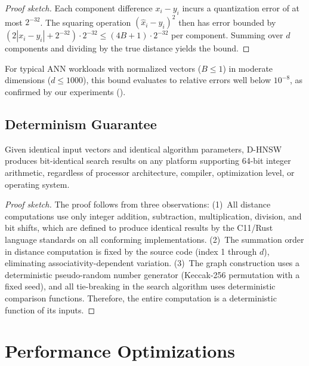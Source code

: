 \documentclass[10pt,journal,compsoc]{IEEEtran}
\newcommand{\dhnsw}{\textsc{D-HNSW}}
\begin{document}
\begin{proof}[Proof sketch]
Each component difference $x_i - y_i$ incurs a quantization error of at most $2^{-32}$. The squaring operation $(\hat{x}_i - \hat{y}_i)^2$ then has error bounded by $(2|x_i - y_i| + 2^{-32}) \cdot 2^{-32} \leq (4B + 1) \cdot 2^{-32}$ per component. Summing over $d$ components and dividing by the true distance yields the bound.
\end{proof}

For typical ANN workloads with normalized vectors ($B \leq 1$) in moderate dimensions ($d \leq 1000$), this bound evaluates to relative errors well below $10^{-8}$, as confirmed by our experiments ().

\subsection{Determinism Guarantee}

\begin{theorem}
\label{thm:determinism}
Given identical input vectors and identical algorithm parameters, \dhnsw{} produces bit-identical search results on any platform supporting 64-bit integer arithmetic, regardless of processor architecture, compiler, optimization level, or operating system.
\end{theorem}

\begin{proof}[Proof sketch]
The proof follows from three observations: (1)~All distance computations use only integer addition, subtraction, multiplication, division, and bit shifts, which are defined to produce identical results by the C11/Rust language standards on all conforming implementations. (2)~The summation order in distance computation is fixed by the source code (index 1 through $d$), eliminating associativity-dependent variation. (3)~The graph construction uses a deterministic pseudo-random number generator (Keccak-256 permutation with a fixed seed), and all tie-breaking in the search algorithm uses deterministic comparison functions. Therefore, the entire computation is a deterministic function of its inputs.
\end{proof}


\section{Performance Optimizations}
\label{sec:optimizations}
\end{document}
